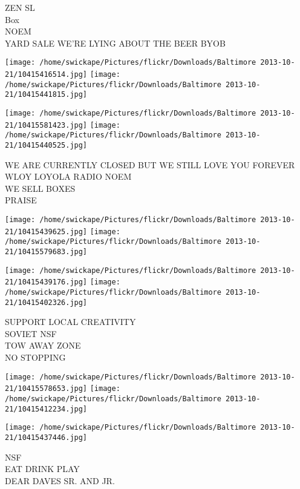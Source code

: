 \documentclass[10pt,letterpaper]{article}
\begin{document}
ZEN SL\\
Box\\
NOEM\\
YARD SALE WE'RE LYING ABOUT THE BEER BYOB\\
\pagebreak

\texttt{[image: /home/swickape/Pictures/flickr/Downloads/Baltimore 2013-10-21/10415416514.jpg]}
\texttt{[image: /home/swickape/Pictures/flickr/Downloads/Baltimore 2013-10-21/10415441815.jpg]}

\texttt{[image: /home/swickape/Pictures/flickr/Downloads/Baltimore 2013-10-21/10415581423.jpg]}
\texttt{[image: /home/swickape/Pictures/flickr/Downloads/Baltimore 2013-10-21/10415440525.jpg]}

WE ARE CURRENTLY CLOSED BUT WE STILL LOVE YOU FOREVER\\
WLOY LOYOLA RADIO NOEM\\
WE SELL BOXES\\
PRAISE\\
\pagebreak

\texttt{[image: /home/swickape/Pictures/flickr/Downloads/Baltimore 2013-10-21/10415439625.jpg]}
\texttt{[image: /home/swickape/Pictures/flickr/Downloads/Baltimore 2013-10-21/10415579683.jpg]}

\texttt{[image: /home/swickape/Pictures/flickr/Downloads/Baltimore 2013-10-21/10415439176.jpg]}
\texttt{[image: /home/swickape/Pictures/flickr/Downloads/Baltimore 2013-10-21/10415402326.jpg]}

SUPPORT LOCAL CREATIVITY\\
SOVIET NSF\\
TOW AWAY ZONE\\
NO STOPPING\\
\pagebreak

\texttt{[image: /home/swickape/Pictures/flickr/Downloads/Baltimore 2013-10-21/10415578653.jpg]}
\texttt{[image: /home/swickape/Pictures/flickr/Downloads/Baltimore 2013-10-21/10415412234.jpg]}

\vspace{0.25in}
\texttt{[image: /home/swickape/Pictures/flickr/Downloads/Baltimore 2013-10-21/10415437446.jpg]}

NSF\\
EAT DRINK PLAY\\
DEAR DAVES SR. AND JR.\\
\pagebreak
\end{document}
